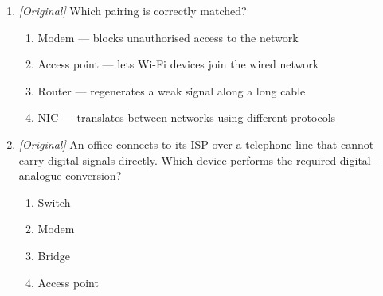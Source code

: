 \documentclass[11pt]{article}
\begin{document}
\begin{enumerate}[label=\textbf{Q\arabic*.}, leftmargin=*]
\begin{enumerate}[label=\Roman*.]
    \item A firewall blocks unauthorised access while letting legitimate
      traffic pass.
  \end{enumerate}
  \begin{enumerate}[label=\Alph*.]
    \item I only
    \item I and II only
    \item II and III only
    \item I, II, and III
  \end{enumerate}
\item \textit{[Original]} Which pairing is correctly matched?
  \begin{enumerate}[label=\Alph*.]
    \item Modem --- blocks unauthorised access to the network
    \item Access point --- lets Wi-Fi devices join the wired network
    \item Router --- regenerates a weak signal along a long cable
    \item NIC --- translates between networks using different protocols
  \end{enumerate}
\item \textit{[Original]} An office connects to its ISP over a telephone line
  that cannot carry digital signals directly. Which device performs the
  required digital--analogue conversion?
  \begin{enumerate}[label=\Alph*.]
    \item Switch
    \item Modem
    \item Bridge
    \item Access point
  \end{enumerate}


\end{enumerate}
\end{document}
